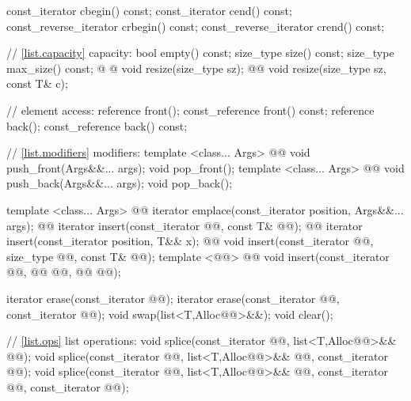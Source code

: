\documentclass[american,twoside]{book}
\begin{document}
\begin{codeblock}
{{    const_iterator         cbegin() const;
    const_iterator         cend() const;
    const_reverse_iterator crbegin() const;
    const_reverse_iterator crend() const;

    // \ref{list.capacity} capacity:
    bool      empty() const;
    size_type size() const;
    size_type max_size() const;
    @ @ void resize(size_type sz);
    @@ void resize(size_type sz, const T& c);

    // element access:
    reference       front();
    const_reference front() const;
    reference       back();
    const_reference back() const;

    // \ref{list.modifiers} modifiers:
    template <class... Args> 
      @@
      void push_front(Args&&... args);
    void pop_front();
    template <class... Args> 
      @@
      void push_back(Args&&... args);
    void pop_back();

    template <class... Args> 
      @@
      iterator emplace(const_iterator position, Args&&... args);
    @@ 
      iterator insert(const_iterator @@, const T& @@);
    @@ 
      iterator insert(const_iterator position, T&& x);
    @@ 
      void insert(const_iterator @@, size_type @@, const T& @@);
    template <@@>
      @@
      void insert(const_iterator @@, @@ @@,
                  @@ @@);

    iterator erase(const_iterator @@);
    iterator erase(const_iterator @@, const_iterator @@);
    void     swap(list<T,Alloc@@>&&);
    void     clear();

    // \ref{list.ops} list operations:
    void splice(const_iterator @@, list<T,Alloc@@>&& @@);
    void splice(const_iterator @@, list<T,Alloc@@>&& @@, const_iterator @@);
    void splice(const_iterator @@, list<T,Alloc@@>&& @@,
                const_iterator @@, const_iterator @@);

}}
\end{codeblock}
\end{document}

